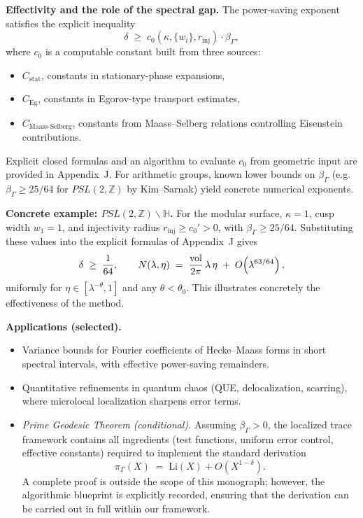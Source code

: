 \medskip
\noindent\textbf{Effectivity and the role of the spectral gap.}
The power-saving exponent satisfies the explicit inequality
\[
  \delta \;\ge\; c_0(\kappa,\{w_i\},r_{\mathrm{inj}})\cdot \beta_\Gamma,
\]
where $c_0$ is a computable constant built from three sources:
\begin{itemize}
  \item $C_{\mathrm{stat}}$, constants in stationary-phase expansions,
  \item $C_{\mathrm{Eg}}$, constants in Egorov-type transport estimates,
  \item $C_{\mathrm{Maass\text{-}Selberg}}$, constants from Maass–Selberg relations
        controlling Eisenstein contributions.
\end{itemize}
Explicit closed formulas and an algorithm to evaluate $c_0$ from geometric input
are provided in Appendix~J. For arithmetic groups, known lower bounds on
$\beta_\Gamma$ (e.g.\ $\beta_\Gamma \ge 25/64$ for $PSL(2,\mathbb{Z})$ by
Kim–Sarnak) yield concrete numerical exponents.

\medskip
\noindent\textbf{Concrete example: $PSL(2,\mathbb{Z})\backslash\mathbb{H}$.}
For the modular surface, $\kappa=1$, cusp width $w_1=1$, and injectivity radius
$r_{\mathrm{inj}}\ge c_0'>0$, with $\beta_\Gamma\ge 25/64$. Substituting these
values into the explicit formulas of Appendix~J gives
\[
  \delta \;\ge\; \frac{1}{64},\qquad
  N(\lambda,\eta) \;=\; \frac{\operatorname{vol}}{2\pi}\,\lambda\,\eta
  \;+\; O\!\left(\lambda^{63/64}\right),
\]
uniformly for $\eta\in[\lambda^{-\theta},1]$ and any $\theta<\theta_0$. This
illustrates concretely the effectiveness of the method.

\medskip
\noindent\textbf{Applications (selected).}
\begin{itemize}
  \item Variance bounds for Fourier coefficients of Hecke–Maass forms in short
  spectral intervals, with effective power-saving remainders.
  \item Quantitative refinements in quantum chaos (QUE, delocalization, scarring),
  where microlocal localization sharpens error terms.
  \item \emph{Prime Geodesic Theorem (conditional).} Assuming $\beta_\Gamma>0$,
  the localized trace framework contains all ingredients (test functions,
  uniform error control, effective constants) required to implement the standard
  derivation
  \[
    \pi_\Gamma(X) \;=\; \mathrm{Li}(X) + O\!\left(X^{1-\delta}\right).
  \]
  A complete proof is outside the scope of this monograph; however, the
  algorithmic blueprint is explicitly recorded, ensuring that the derivation can
  be carried out in full within our framework.
\end{itemize}

